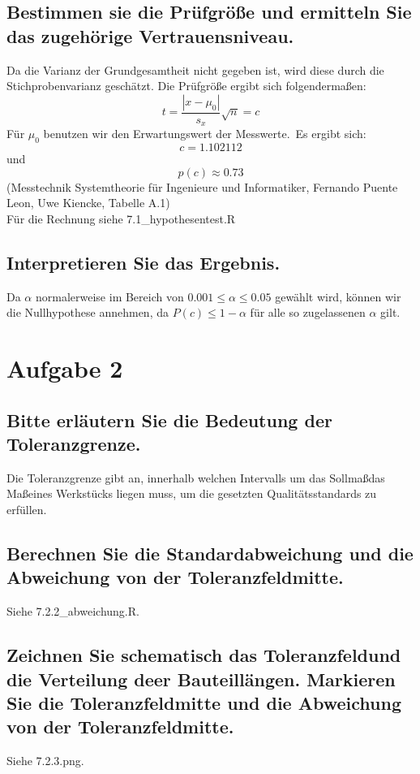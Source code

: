 \documentclass[12pt, a4paper, titlepage]{article}
\begin{document}
	\subsection{Bestimmen sie die Pr\"ufgr\"o\ss e und ermitteln Sie das zugeh\"orige Vertrauensniveau.}
	Da die Varianz der Grundgesamtheit nicht gegeben ist, wird diese durch die Stichprobenvarianz gesch\"atzt.
	Die Pr\"ufgr\"o\ss e ergibt sich folgenderma\ss en:
	$$t=\frac{|x - \mu_0|}{s_x}\sqrt{n} = c$$
	F\"ur $\mu_0$ benutzen wir den Erwartungswert der Messwerte.\
	Es ergibt sich: 
	$$c = 1.102112$$ und $$p(c)\approx 0.73$$ (Messtechnik
	Systemtheorie f\"ur Ingenieure und Informatiker, Fernando Puente Leon, Uwe Kiencke, Tabelle A.1)\\
	F\"ur die Rechnung siehe 7.1\_hypothesentest.R 
	
	\subsection{Interpretieren Sie das Ergebnis.}
	Da $\alpha$ normalerweise im Bereich von $0.001 \leq \alpha \leq 0.05$ gew\"ahlt wird, k\"onnen wir die Nullhypothese annehmen, da $P(c)\leq 1-\alpha$ f\"ur alle so zugelassenen $\alpha$ gilt.
	 
	 \section{Aufgabe 2}
	 
	 \subsection{Bitte erl\"autern Sie die Bedeutung der Toleranzgrenze.}
	 Die Toleranzgrenze gibt an, innerhalb welchen Intervalls um das Sollma\ss  das Ma\ss  eines Werkst\"ucks liegen muss,
	 um die gesetzten Qualit\"atsstandards zu erf\"ullen.
	 
	 \subsection{Berechnen Sie die Standardabweichung und die Abweichung von der Toleranzfeldmitte.}
	 Siehe 7.2.2\_abweichung.R.
	 
	 \subsection{Zeichnen Sie schematisch das Toleranzfeldund die Verteilung deer Bauteill\"angen. Markieren Sie die
	 	Toleranzfeldmitte und die Abweichung von der Toleranzfeldmitte.}
	 Siehe 7.2.3.png.
	 
\end{document}
